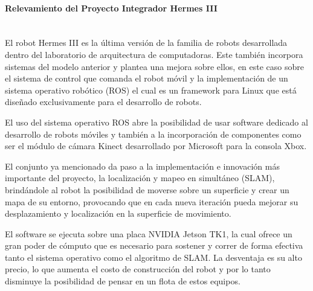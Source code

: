 \paragraph{Relevamiento del Proyecto Integrador Hermes III} \mbox{} \vspace{2pt} \\

El robot Hermes III es la última versión de la familia de robots desarrollada dentro del laboratorio de arquitectura de computadoras. Este también incorpora sistemas del modelo anterior y plantea una mejora sobre ellos, en este caso sobre el sistema de control que comanda el robot móvil y la implementación de un sistema operativo robótico (ROS) el cual es un framework para Linux que está diseñado exclusivamente para el desarrollo de robots.

El uso del sistema operativo ROS abre la posibilidad de usar software dedicado al desarrollo de robots móviles y también a la incorporación de componentes como ser el módulo de cámara Kinect desarrollado por Microsoft para la consola Xbox.

El conjunto ya mencionado da paso a la implementación e innovación más importante del proyecto, la localización y mapeo en simultáneo (SLAM), brindándole al robot la posibilidad de moverse sobre un superficie y crear un mapa de su entorno, provocando que en cada nueva iteración pueda mejorar su desplazamiento y localización en la superficie de movimiento.

El software se ejecuta sobre una placa NVIDIA Jetson TK1, la cual ofrece un gran poder de cómputo que es necesario para sostener y correr de forma efectiva tanto el sistema operativo como el algoritmo de SLAM. La desventaja es su alto precio, lo que aumenta el costo de construcción del robot y por lo tanto disminuye la posibilidad de pensar en un flota de estos equipos.